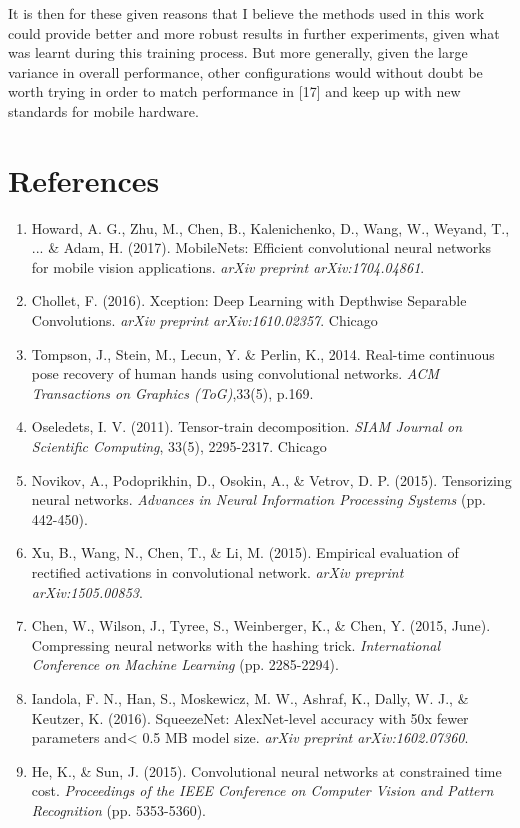 \documentclass{article}
\begin{document}
It is then for these given reasons that I believe the methods used in this work could provide better and more robust results in further experiments, given what was learnt during this training process. But more generally, given the large variance in overall performance, other configurations would without doubt be worth trying in order to match performance in [17] and keep up with new standards for mobile hardware.


\section*{References}
\begin{enumerate}
\item Howard, A. G., Zhu, M., Chen, B., Kalenichenko, D., Wang, W., Weyand, T., ... \& Adam, H. (2017). MobileNets: Efficient convolutional neural networks for mobile vision applications. \emph{arXiv preprint arXiv:1704.04861}.
\item Chollet, F. (2016). Xception: Deep Learning with Depthwise Separable Convolutions. \emph{arXiv preprint arXiv:1610.02357}.
Chicago	
\item Tompson, J., Stein, M., Lecun, Y. \& Perlin, K., 2014. Real-time continuous pose recovery of human hands using convolutional networks. \emph{ACM Transactions on Graphics (ToG)},33(5), p.169.
\item Oseledets, I. V. (2011). Tensor-train decomposition. \emph{SIAM Journal on Scientific Computing}, 33(5), 2295-2317.
Chicago	
\item Novikov, A., Podoprikhin, D., Osokin, A., \& Vetrov, D. P. (2015). Tensorizing neural networks. \emph{Advances in Neural Information Processing Systems} (pp. 442-450).
\item Xu, B., Wang, N., Chen, T., \& Li, M. (2015). Empirical evaluation of rectified activations in convolutional network. \emph{arXiv preprint arXiv:1505.00853}.
\item Chen, W., Wilson, J., Tyree, S., Weinberger, K., \& Chen, Y. (2015, June). Compressing neural networks with the hashing trick. \emph{International Conference on Machine Learning} (pp. 2285-2294).
\item Iandola, F. N., Han, S., Moskewicz, M. W., Ashraf, K., Dally, W. J., \& Keutzer, K. (2016). SqueezeNet: AlexNet-level accuracy with 50x fewer parameters and< 0.5 MB model size. \emph{arXiv preprint arXiv:1602.07360}.
\item He, K., \& Sun, J. (2015). Convolutional neural networks at constrained time cost. \emph{Proceedings of the IEEE Conference on Computer Vision and Pattern Recognition} (pp. 5353-5360).

\end{enumerate}
\end{document}
